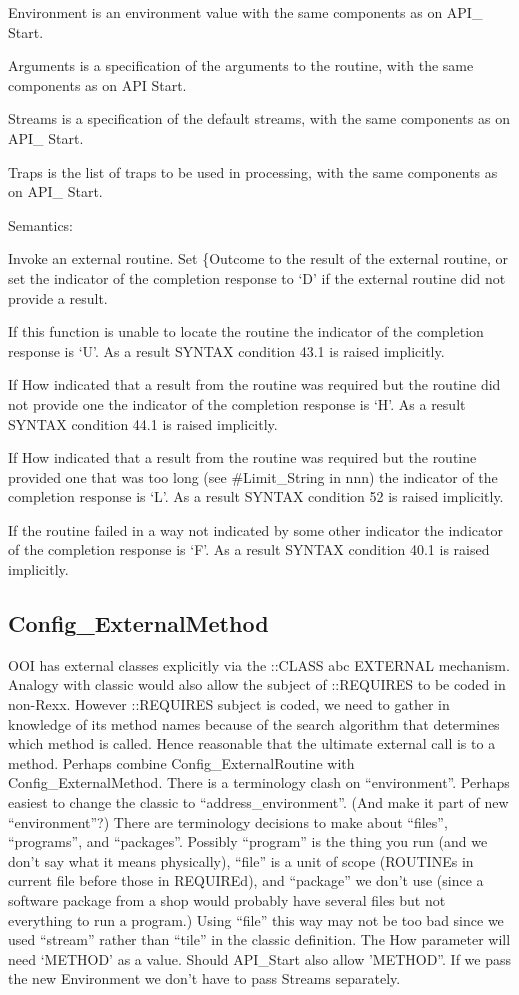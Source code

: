 Environment is an environment value with the same components as on API\_
Start.

Arguments is a specification of the arguments to the routine, with the
same components as on API Start.

Streams is a specification of the default streams, with the same
components as on API\_ Start.

Traps is the list of traps to be used in processing, with the same
components as on API\_ Start.

Semantics:

Invoke an external routine. Set \{Outcome to the result of the external
routine, or set the indicator of the completion response to `D' if the
external routine did not provide a result.

If this function is unable to locate the routine the indicator of the
completion response is `U'. As a result SYNTAX condition 43.1 is raised
implicitly.

If How indicated that a result from the routine was required but the
routine did not provide one the indicator of the completion response is
`H'. As a result SYNTAX condition 44.1 is raised implicitly.

If How indicated that a result from the routine was required but the
routine provided one that was too long (see \#Limit\_String in nnn) the
indicator of the completion response is `L'. As a result SYNTAX
condition 52 is raised implicitly.

If the routine failed in a way not indicated by some other indicator the
indicator of the completion response is `F'. As a result SYNTAX
condition 40.1 is raised implicitly.

\hypertarget{config_externalmethod}{%
\subsection{Config\_ExternalMethod}\label{config_externalmethod}}

OOI has external classes explicitly via the ::CLASS abc EXTERNAL
mechanism. Analogy with classic would also allow the subject of
::REQUIRES to be coded in non-Rexx. However ::REQUIRES subject is coded,
we need to gather in knowledge of its method names because of the search
algorithm that determines which method is called. Hence reasonable that
the ultimate external call is to a method. Perhaps combine
Config\_ExternalRoutine with Config\_ExternalMethod. There is a
terminology clash on ``environment''. Perhaps easiest to change the
classic to ``address\_environment''. (And make it part of new
``environment''?) There are terminology decisions to make about
``files'', ``programs'', and ``packages''. Possibly ``program'' is the
thing you run (and we don't say what it means physically), ``file'' is a
unit of scope (ROUTINEs in current file before those in REQUIREd), and
``package'' we don't use (since a software package from a shop would
probably have several files but not everything to run a program.) Using
``file'' this way may not be too bad since we used ``stream'' rather
than ``tile'' in the classic definition. The How parameter will need
`METHOD' as a value. Should API\_Start also allow 'METHOD''. If we pass
the new Environment we don't have to pass Streams separately.

